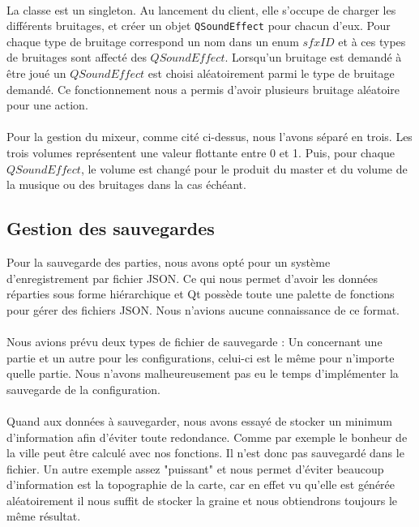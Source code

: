 \documentclass[a4paper,10pt,openany,oneside]{report}
\begin{document}
\paragraph{}
La classe est un singleton. Au lancement du client, elle s'occupe de charger les différents bruitages, et créer un objet \texttt{QSoundEffect} pour chacun d'eux. Pour chaque type de bruitage correspond un nom dans un enum $sfxID$ et à ces types de bruitages sont affecté des $QSoundEffect$. Lorsqu'un bruitage est demandé à être joué un $QSoundEffect$ est choisi aléatoirement parmi le type de bruitage demandé. Ce fonctionnement nous a permis d'avoir plusieurs bruitage aléatoire pour une action.
\paragraph{}
Pour la gestion du mixeur, comme cité ci-dessus, nous l'avons séparé en trois. Les trois volumes représentent une valeur flottante entre 0 et 1. Puis, pour chaque $QSoundEffect$, le volume est changé pour le produit du master et du volume de la musique ou des bruitages dans la cas échéant.
\subsection{Gestion des sauvegardes}
Pour la sauvegarde des parties, nous avons opté pour un système d'enregistrement par fichier JSON. Ce qui nous permet d'avoir les données réparties sous forme hiérarchique et Qt possède toute une palette de fonctions pour gérer des fichiers JSON. Nous n'avions aucune connaissance de ce format.
\paragraph{}
Nous avions prévu deux types de fichier de sauvegarde : Un concernant une partie et un autre pour les configurations, celui-ci est le même pour n'importe quelle partie. Nous n'avons malheureusement pas eu le temps d'implémenter la sauvegarde de la configuration.
\paragraph{}
Quand aux données à sauvegarder, nous avons essayé de stocker un minimum d'information afin d'éviter toute redondance. Comme par exemple le bonheur de la ville peut être calculé avec nos fonctions. Il n'est donc pas sauvegardé dans le fichier. Un autre exemple assez "puissant" et nous permet d'éviter beaucoup d'information est la topographie de la carte, car en effet vu qu'elle est générée aléatoirement il nous suffit de stocker la graine et nous obtiendrons toujours le même résultat.
\end{document}

